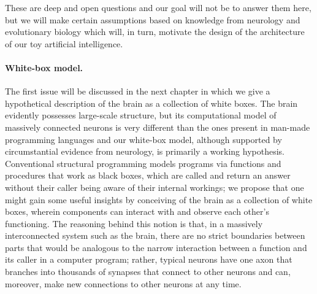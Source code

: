 These are deep and open questions and our goal will not be to answer them here, but we will make certain assumptions based on knowledge from neurology and evolutionary biology which will, in turn, motivate the design of the architecture of our toy artificial intelligence.

\paragraph{White-box model.}%
%
The first issue will be discussed in the next chapter in which we give a hypothetical description of the brain as a collection of white boxes. The brain evidently possesses large-scale structure, but its computational model of massively connected neurons is very different than the ones present in man-made programming languages \cite[Section ``Introducing the Neuron'']{handbookBrainTheory} and our white-box model, although supported by circumstantial evidence from neurology, is primarily a working hypothesis. Conventional structural programming models programs via functions and procedures that work as black boxes, which are called and return an answer without their caller being aware of their internal workings; we propose that one might gain some useful insights by conceiving of the brain as a collection of white boxes, wherein components can interact with and observe each other's functioning. The reasoning behind this notion is that, in a massively interconnected system such as the brain, there are no strict boundaries between parts that would be analogous to the narrow interaction between a function and its caller in a computer program; rather, typical neurons have one axon that branches into thousands of synapses that connect to other neurons \cite[p.\ 4]{handbookBrainTheory} and can, moreover, make new connections to other neurons at any time.

